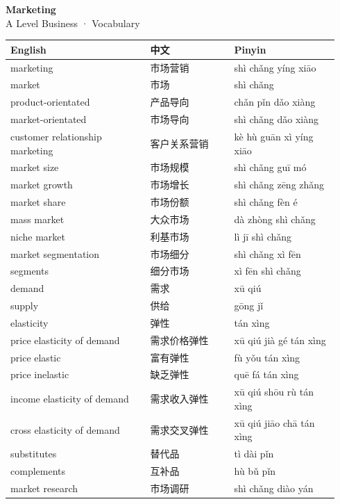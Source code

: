 \documentclass[11pt]{article}
\begin{document}
\begin{center}
  {\LARGE\bfseries Marketing}\\[0.35em]
  {\large A Level Business · Vocabulary}
\end{center}
\vspace{0.6em}

\begin{longtable}{@{}p{0.40\linewidth}p{0.24\linewidth}p{0.30\linewidth}@{}}
\toprule
\textbf{English} & \textbf{中文} & \textbf{Pinyin} \\
\midrule
\endhead
\bottomrule
\endlastfoot
marketing & 市场营销 & shì chǎng yíng xiāo \\
market & 市场 & shì chǎng \\
product-orientated & 产品导向 & chǎn pǐn dǎo xiàng \\
market-orientated & 市场导向 & shì chǎng dǎo xiàng \\
customer relationship marketing & 客户关系营销 & kè hù guān xì yíng xiāo \\
market size & 市场规模 & shì chǎng guī mó \\
market growth & 市场增长 & shì chǎng zēng zhǎng \\
market share & 市场份额 & shì chǎng fèn é \\
mass market & 大众市场 & dà zhòng shì chǎng \\
niche market & 利基市场 & lì jī shì chǎng \\
market segmentation & 市场细分 & shì chǎng xì fēn \\
segments & 细分市场 & xì fēn shì chǎng \\
demand & 需求 & xū qiú \\
supply & 供给 & gōng jǐ \\
elasticity & 弹性 & tán xìng \\
price elasticity of demand & 需求价格弹性 & xū qiú jià gé tán xìng \\
price elastic & 富有弹性 & fù yǒu tán xìng \\
price inelastic & 缺乏弹性 & quē fá tán xìng \\
income elasticity of demand & 需求收入弹性 & xū qiú shōu rù tán xìng \\
cross elasticity of demand & 需求交叉弹性 & xū qiú jiāo chā tán xìng \\
substitutes & 替代品 & tì dài pǐn \\
complements & 互补品 & hù bǔ pǐn \\
market research & 市场调研 & shì chǎng diào yán \\

\end{longtable}
\end{document}
